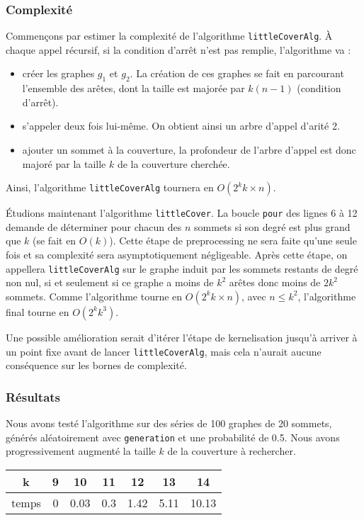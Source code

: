 \documentclass[a4paper,10pt]{article}
\newcommand*{\itemb}{\item[$\bullet$]}
\begin{document}
\subsubsection{Complexité}

Commençons par estimer la complexité de l'algorithme \texttt{littleCoverAlg}. À chaque appel récursif, si la condition d'arrêt n'est pas remplie, l'algorithme va :
\begin{itemize}
 \itemb créer les graphes $g_1$ et $g_2$. La création de ces graphes se fait en parcourant l'ensemble des arêtes, dont la taille est majorée par $k(n-1)$ (condition d'arrêt).
 \itemb s'appeler deux fois lui-même. On obtient ainsi un arbre d'appel d'arité 2.
 \itemb ajouter un sommet à la couverture, la profondeur de l'arbre d'appel est donc majoré par la taille $k$ de la couverture cherchée.
\end{itemize}

Ainsi, l'algorithme \texttt{littleCoverAlg} tournera en $O(2^k k\times n)$. 

\vspace{0.35cm}
Étudions maintenant l'algorithme \texttt{littleCover}. La boucle \texttt{pour} des lignes 6 à 12 demande de déterminer pour chacun des $n$ sommets si son degré est plus grand que $k$ (se fait en $O(k)$). Cette étape de preprocessing ne sera faite qu'une seule fois et sa complexité sera asymptotiquement négligeable. Après cette étape, on appellera \texttt{littleCoverAlg} sur le graphe induit par les sommets restants de degré non nul, si et seulement si ce graphe a moins de $k^2$ arêtes donc moins de $2k^2$ sommets. Comme l'algorithme tourne en $O(2^k k\times n)$, avec $n\leqslant k^2$, l'algorithme final tourne en $O(2^k k^3)$.

Une possible amélioration serait d'itérer l'étape de kernelisation jusqu'à arriver à un point fixe avant de lancer \texttt{littleCoverAlg}, mais cela n'aurait aucune conséquence sur les bornes de complexité.

\subsubsection{Résultats}

Nous avons testé l'algorithme sur des séries de 100 graphes de 20 sommets, générés aléatoirement avec \texttt{generation} et une probabilité de 0.5.
Nous avons progressivement augmenté la taille $k$ de la couverture à rechercher.

\begin{center}
\begin{tabular}{|c|c|c|c|c|c|c|}
	\hline 
	k & 9 & 10 & 11 & 12 & 13 & 14  \\
	\hline
	temps & 0 & 0.03 & 0.3 & 1.42 & 5.11 & 10.13  \\
	\hline
\end{tabular}
\end{center}
\end{document}
